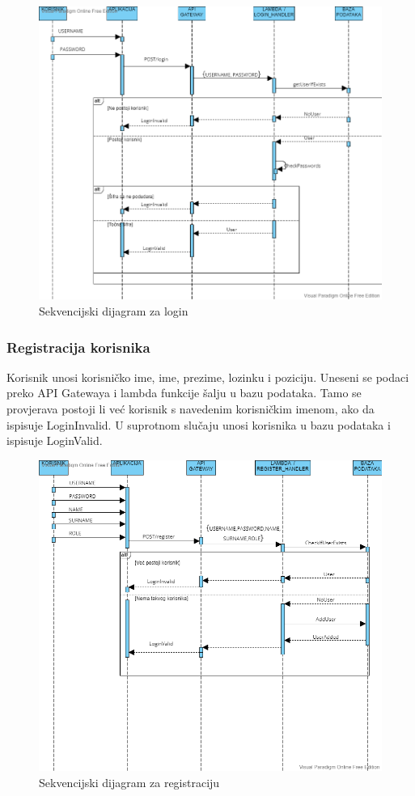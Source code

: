 			\begin{figure}
				\includegraphics[width=\linewidth]{./dijagrami/Login.png}
				\caption{Sekvencijski dijagram za login}
				\label{fig:Login}
			\end{figure}
			
			
			
			\subsubsection{Registracija korisnika}
			
			Korisnik unosi korisničko ime, ime, prezime, lozinku i poziciju. Uneseni se podaci preko API Gatewaya i lambda funkcije šalju u bazu podataka. Tamo se provjerava postoji li već korisnik s navedenim korisničkim imenom, ako da ispisuje LoginInvalid. U suprotnom slučaju unosi korisnika u bazu podataka i ispisuje LoginValid.
			\eject
			
			\begin{figure}
				\includegraphics[width=\linewidth]{./dijagrami/Register.png}
				\caption{Sekvencijski dijagram za registraciju}
				\label{fig:Register}
			\end{figure}
